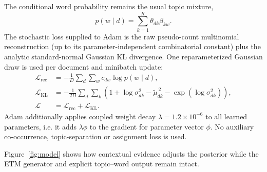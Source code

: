 \documentclass[10pt,a4paper]{article}
\begin{document}
The conditional word probability remains the usual topic mixture,
\begin{equation}
  p(w\mid d)=\sum_{k=1}^K\theta_{dk}\beta_{kw}.
  \label{eq:mixture}
\end{equation}
The stochastic loss supplied to Adam is the raw pseudo-count multinomial
reconstruction (up to its parameter-independent combinatorial constant) plus
the analytic standard-normal Gaussian KL divergence. One reparameterized Gaussian draw is
used per document and minibatch update:
\begin{align}
  \mathcal L_{\mathrm{rec}}
  &=-\frac1D\sum_d\sum_w c_{dw}\log p(w\mid d),
  \label{eq:reconstruction}\\
  \mathcal L_{\mathrm{KL}}
  &=-\frac{1}{2D}\sum_d\sum_k
  \left(1+\log\sigma_{dk}^2-\widetilde\mu_{dk}^{\,2}
  -\exp(\log\sigma_{dk}^2)\right),
  \label{eq:kl}\\
  \mathcal L&=\mathcal L_{\mathrm{rec}}+\mathcal L_{\mathrm{KL}}.
  \label{eq:objective}
\end{align}
Adam additionally applies coupled weight decay $\lambda=1.2\times10^{-6}$ to
all learned parameters, i.e. it adds $\lambda\phi$ to the gradient for parameter
vector $\phi$. No auxiliary co-occurrence, topic-separation or assignment loss
is used.

Figure~\ref{fig:model} shows how contextual evidence adjusts the posterior while the ETM
generator and explicit topic--word output remain intact.
\end{document}
